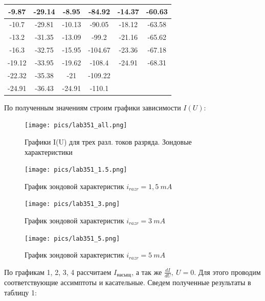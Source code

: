 \begin{table}[!]
\begin{center}
\begin{tabular}{| c | c | c | c | c | c |}
        \hline
        -9.87 & -29.14 & -8.95 & -84.92 & -14.37 & -60.63\\
        \hline
        -10.7 & -29.81 & -10.13 & -90.05 & -18.12 & -63.58\\
        \hline
        -13.2 & -31.35 & -13.09 & -99.2 & -21.16 & -65.62\\
        \hline
        -16.3 & -32.75 & -15.95 & -104.67 & -23.36 & -67.18\\
        \hline
        -19.12 & -33.95 & -19.62 & -108.4 & -24.91 & -68.31\\
        \hline
        -22.32 & -35.38 & -21 & -109.22 &  & \\
        \hline
        -24.91 & -36.43 & -24.91 & -110.1 &  & \\
        \hline
  	\end{tabular}
  \end{center}
\label{A_table}
\end{table}

По полученным значениям строим графики зависимости $I(U)$:

\begin{figure}[h!]
	\centering
	\texttt{[image: pics/lab351\_all.png]}
	\caption{Графики I(U) для трех разл. токов разряда. Зондовые характеристики}
	\label{C}
\end{figure}

\begin{figure}[h!]
	\centering
	\texttt{[image: pics/lab351\_1.5.png]}
	\caption{График зондовой характеристик $i_{razr} = 1,5 \: mA$}
	\label{C}
\end{figure}


\begin{figure}[h!]
	\centering
	\texttt{[image: pics/lab351\_3.png]}
	\caption{График зондовой характеристик $i_{razr} = 3 \: mA$}
	\label{C}
\end{figure}

\begin{figure}[h!]
	\centering
	\texttt{[image: pics/lab351\_5.png]}
	\caption{График зондовой характеристик $i_{razr} = 5 \: mA$}
	\label{C}
\end{figure}


\newpage


По графикам 1, 2, 3, 4 рассчитаем $I_{насыщ}$, а так же $\frac{dI}{dU}, \: U = 0$.
Для этого проводим соответствующие ассимптоты и касательные. Сведем полученные результаты в таблицу 1:

